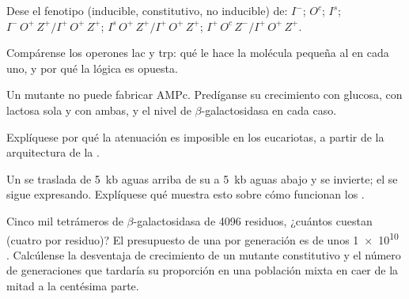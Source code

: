 \begin{exercise}[$\star\star$]\label{exo:b1:expression-control:5}
Dese el fenotipo (inducible, constitutivo, no inducible) de: $I^-$;
$O^c$; $I^s$; $I^-\,O^+\,Z^+ / I^+\,O^+\,Z^+$; $I^s\,O^+\,Z^+ /
I^+\,O^+\,Z^+$; $I^+\,O^c\,Z^- / I^+\,O^+\,Z^+$.
\end{exercise}

\begin{exercise}[$\star\star$]\label{exo:b1:expression-control:6}
Compárense los operones lac y trp: qué le hace la molécula pequeña al
 en cada uno, y por qué la lógica es opuesta.
\end{exercise}

\begin{exercise}[$\star\star$]\label{exo:b1:expression-control:7}
Un mutante no puede fabricar AMPc. Predíganse su crecimiento con glucosa,
con lactosa sola y con ambas, y el nivel de $\beta$-galactosidasa en cada
caso.
\end{exercise}

\begin{exercise}[$\star\star$]\label{exo:b1:expression-control:8}
Explíquese por qué la atenuación es imposible en los eucariotas, a partir de
la arquitectura de la .
\end{exercise}

\begin{exercise}[$\star\star$]\label{exo:b1:expression-control:9}
Un  se traslada de \qty{5}{kb} aguas arriba de su  a
\qty{5}{kb} aguas abajo y se invierte; el  se sigue expresando.
Explíquese qué muestra esto sobre cómo funcionan los .
\end{exercise}

\begin{exercise}[$\star\star\star$]\label{exo:b1:expression-control:10}
Cinco mil tetrámeros de $\beta$-galactosidasa de \qty{4096}{} residuos,
¿cuántos  cuestan (cuatro por residuo)? El presupuesto de una  por
generación es de unos \qty{1e10}{} . Calcúlense la desventaja de
crecimiento de un mutante constitutivo y el número de generaciones que
tardaría su proporción en una población mixta en caer de la mitad a la
centésima parte.
\end{exercise}

